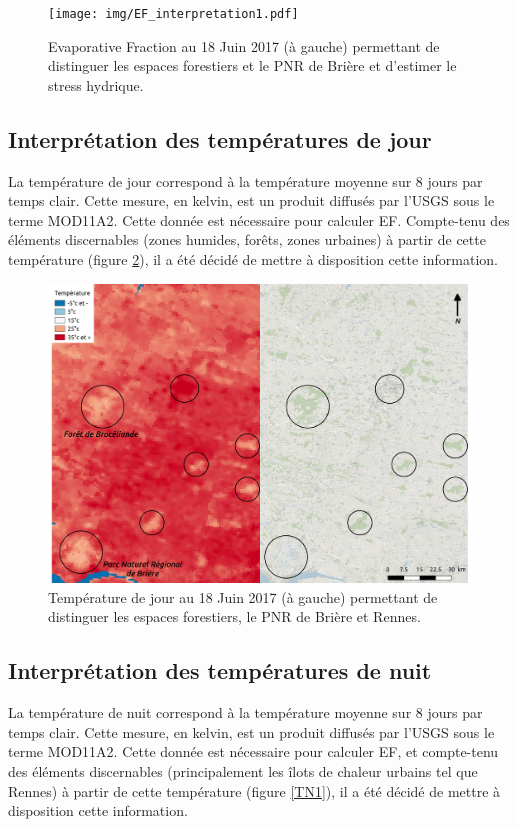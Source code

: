 \documentclass[10pt,a4paper]{article}
\begin{document}
\begin{figure}[!h]
\centering
\texttt{[image: img/EF\_interpretation1.pdf]}
\caption{Evaporative Fraction au 18 Juin 2017 (à gauche) permettant de distinguer les espaces forestiers et le PNR de Brière et d'estimer le stress hydrique.}
\label{EF1}
\end{figure}

\subsection{Interprétation des températures de jour}

La température de jour correspond à la température moyenne sur 8 jours par temps clair. Cette mesure, en kelvin, est un produit diffusés par l'USGS sous le terme MOD11A2. Cette donnée est nécessaire pour calculer EF. Compte-tenu des éléments discernables (zones humides, forêts, zones urbaines) à partir de cette température (figure \ref{TJ1}), il a été décidé de mettre à disposition cette information. \smallbreak

\begin{figure}[!h]
\centering
\includegraphics[scale=0.33]{img/TJ_interpretation1.pdf}
\caption{Température de jour au 18 Juin 2017 (à gauche) permettant de distinguer les espaces forestiers, le PNR de Brière et Rennes.}
\label{TJ1}
\end{figure}

\subsection{Interprétation des températures de nuit}

La température de nuit correspond à la température moyenne sur 8 jours par temps clair. Cette mesure, en kelvin, est un produit diffusés par l'USGS sous le terme MOD11A2. Cette donnée est nécessaire pour calculer EF, et compte-tenu des éléments discernables (principalement les îlots de chaleur urbains tel que Rennes) à partir de cette température (figure \ref{TN1}), il a été décidé de mettre à disposition cette information. \smallbreak \newpage
\end{document}
